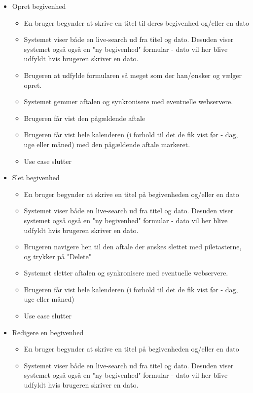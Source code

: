 \documentclass{article}
\begin{document}
   \begin{itemize}
   \item Opret begivenhed
   	\begin{itemize}
   	\item En bruger begynder at skrive en titel til deres begivenhed og/eller en dato
   	\item Systemet viser både en live-search ud fra titel og dato. Desuden viser systemet også også en "ny begivenhed" formular - dato vil her blive udfyldt hvis brugeren skriver en dato.
   	
   	\item Brugeren at udfylde formularen så meget som der han/ønsker og vælger opret.
   	\item Systemet gemmer aftalen og synkronisere med eventuelle webservere.
   	\item Brugeren får vist den pågældende aftale
   	\item Brugeren får vist hele kalenderen (i forhold til det de fik vist før - dag, uge eller måned) med den pågældende aftale markeret.
   	\item Use case slutter
   	\end{itemize}
   \item Slet begivenhed
   \begin{itemize}
   	\item En bruger begynder at skrive en titel på begivenheden og/eller en dato
   	\item Systemet viser både en live-search ud fra titel og dato. Desuden viser systemet også også en "ny begivenhed" formular - dato vil her blive udfyldt hvis brugeren skriver en dato.
   	\item Brugeren navigere hen til den aftale der ønskes slettet med piletasterne, og trykker på "Delete"
   	\item Systemet sletter aftalen og synkronisere med eventuelle webservere.
   	\item Brugeren får vist hele kalenderen (i forhold til det de fik vist før - dag, uge eller måned)
   	\item Use case slutter
   	\end{itemize}
   \item Redigere en begivenhed
    \begin{itemize}
   	\item En bruger begynder at skrive en titel på begivenheden og/eller en dato
   	\item Systemet viser både en live-search ud fra titel og dato. Desuden viser systemet også også en "ny begivenhed" formular - dato vil her blive udfyldt hvis brugeren skriver en dato.

\end{itemize}
\end{itemize}
\end{document}
